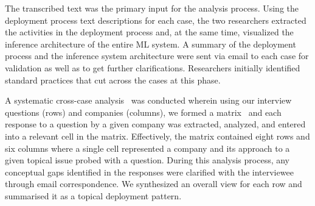 The transcribed text was the primary input for the analysis process. Using the deployment process text descriptions for each case, the two researchers extracted the activities in the deployment process and, at the same time, visualized the inference architecture of the entire ML system. A summary of the deployment process and the inference system architecture were sent via email to each case for validation as well as to get further clarifications. Researchers initially identified standard practices that cut across the cases at this phase. 

A systematic cross-case analysis~\cite{seaman1999qualitative} was conducted wherein using our interview questions (rows) and companies (columns), we formed a matrix~\cite{webster2002analyzing} and each response to a question by a given company was extracted, analyzed, and entered into a relevant cell in the matrix. Effectively, the matrix contained eight rows and six columns where a single cell represented a company and its approach to a given topical issue probed with a question. During this analysis process, any conceptual gaps identified in the responses were clarified with the interviewee through email correspondence. We synthesized an overall view for each row and summarised it as a topical deployment pattern.






